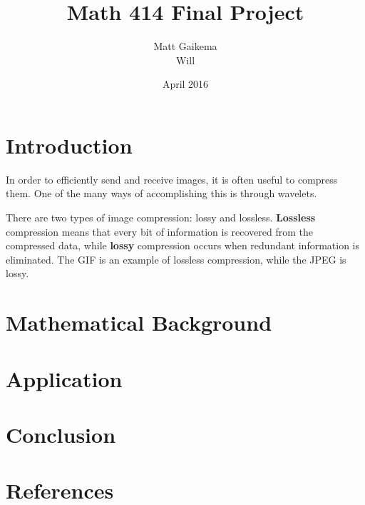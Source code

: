 \documentclass{article}
\title{Math 414 Final Project}
\author{Matt Gaikema \\ Will}
\date{April 2016}
\begin{document}
\maketitle

\section{Introduction}

In order to efficiently send and receive images, it is often useful to compress them.
One of the many ways of accomplishing this is through wavelets.

There are two types of image compression: lossy and lossless.
\textbf{Lossless} compression means that every bit of information is recovered from the compressed data,
while \textbf{lossy} compression occurs when redundant information is eliminated.
The GIF is an example of lossless compression, while the JPEG is lossy.


\section{Mathematical Background}


\section{Application}


\section{Conclusion}


\section{References}
\end{document}
